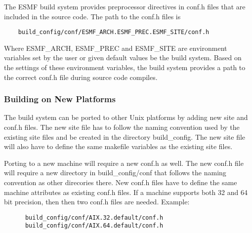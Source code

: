 The ESMF build system provides preprocessor directives in conf.h files
that are included in the source code.  The path to the conf.h files is

\begin{verbatim}
    build_config/conf/ESMF_ARCH.ESMF_PREC.ESMF_SITE/conf.h
\end{verbatim}

Where ESMF\_ARCH, ESMF\_PREC and ESMF\_SITE are environment variables 
set by the user or given default values be the build system.  Based on 
the settings of these environment variables, the build system provides
a path to the correct conf.h file during source code compiles.


\subsubsection{Building on New Platforms}

The build system can be ported to other Unix platforms by adding new
site and conf.h files.  The new site file has to follow the naming
convention used by the existing site files and be created in the
directory build\_config.  The new site file will also have to define
the same makefile variables as the existing site files.

Porting to a new machine will require a new conf.h as well. The new
conf.h file will require a new directory in build\_config/conf that
follows the naming convention as other direcories there.
New conf.h files have to define the same machine attributes as
existing conf.h files.  If a machine supports both 32 and 64 bit
precision, then then two conf.h files are needed.  Example:

\begin{verbatim}
      build_config/conf/AIX.32.default/conf.h
      build_config/conf/AIX.64.default/conf.h
\end{verbatim}

